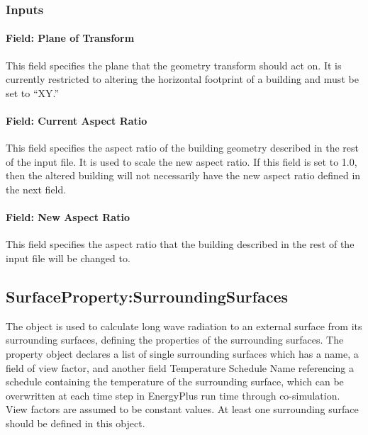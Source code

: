 \subsubsection{Inputs}\label{inputs-16}

\paragraph{Field: Plane of Transform}\label{field-plane-of-transform}

This field specifies the plane that the geometry transform should act on. It is currently restricted to altering the horizontal footprint of a building and must be set to ``XY.''

\paragraph{Field: Current Aspect Ratio}\label{field-current-aspect-ratio}

This field specifies the aspect ratio of the building geometry described in the rest of the input file. It is used to scale the new aspect ratio. If this field is set to 1.0, then the altered building will not necessarily have the new aspect ratio defined in the next field.

\paragraph{Field: New Aspect Ratio}\label{field-new-aspect-ratio}

This field specifies the aspect ratio that the building described in the rest of the input file will be changed to.

\subsection{SurfaceProperty:SurroundingSurfaces}\label{surfacePropertySurroundingSurfaces}

The object is used to calculate long wave radiation to an external surface from its surrounding surfaces, defining the properties of the surrounding surfaces. The property object declares a list of single surrounding surfaces which has a name, a field of view factor, and another field Temperature Schedule Name referencing a schedule containing the temperature of the surrounding surface, which can be overwritten at each time step in EnergyPlus run time through co-simulation. View factors are assumed to be constant values. At least one surrounding surface should be defined in this object.


